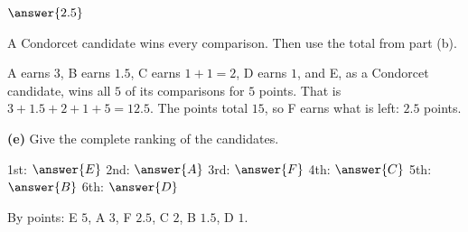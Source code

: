 \documentclass[12pt]{ximera}
\begin{document}
\begin{problem}
\begin{prompt}
$\answer{2.5}$

\begin{hint}
A Condorcet candidate wins every comparison. Then use the total from part (b).
\end{hint}

\begin{feedback}
A earns $3$, B earns $1.5$, C earns $1+1=2$, D earns $1$, and E, as a Condorcet
candidate, wins all $5$ of its comparisons for $5$ points. That is $3+1.5+2+1+5=12.5$. The points total $15$, so F earns what is left: $2.5$ points.
\end{feedback}
\end{prompt}

\begin{prompt}
\textbf{(e)} Give the complete ranking of the candidates.

1st: $\answer{E}$ \quad 2nd: $\answer{A}$ \quad 3rd: $\answer{F}$ \quad 4th: $\answer{C}$ \quad 5th: $\answer{B}$ \quad 6th: $\answer{D}$

\begin{feedback}
By points: E $5$, A $3$, F $2.5$, C $2$, B $1.5$, D $1$.
\end{feedback}
\end{prompt}
\end{problem}
\end{document}
